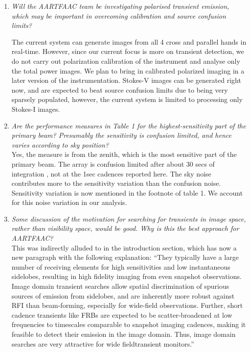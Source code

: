\documentclass{article}
\begin{document}
\begin {enumerate}
  
\item  \textit {Will  the  AARTFAAC team  be  investigating polarised  transient
  emission,  which  may  be  important  in  overcoming  calibration  and  source
  confusion limits?}

  The current system can generate images from  all 4 cross and parallel hands in
  real-time. However, since our current focus is more on transient detection, we
  do not carry  out polarization calibration of the instrument  and analyse only
  the total power images. We plan to  bring in calibrated polarized imaging in a
  later version of the instrumentation.   Stokes-V images can be generated right
  now,  and are  expected to  beat  source confusion  limits due  to being  very
  sparsely populated, however, the current  system is limited to processing only
  Stokes-I images.
  

\item   \textit   {Are  the   performance   measures   in   Table  1   for   the
  highest-sensitivity part  of the primary  beam? Presumably the  sensitivity is
  confusion limited, and hence varies according to sky position?}\\
  
  Yes, the measure is  from the zenith, which is the most  sensitive part of the
  primary  beam.   The  array  is  confusion limited  after  about  30  secs  of
  integration \citep{prasad2014real},  not at  the 1sec cadences  reported here.
  The sky noise contributes more to the sensitivity variation than the confusion
  noise. Sensitivity variation is now mentioned  in the footnote of table 1.  We
  account for this noise variation in our analysis.
  

\item \textit {Some discussion of the motivation for searching for transients in
  image space, rather than visibility space, would be good. Why is this the best
  approach for AARTFAAC?}\\

  This was  indirectly alluded to in  the introduction section, which  has now a
  new paragraph  with the following  explanation: ``They typically have  a large
  number  of receiving  elements for  high sensitivities  and low  instantaneous
  sidelobes, resulting in high fidelity imaging from even snapshot observations.
  Image  domain  transient searches  allow  spatial  discrimination of  spurious
  sources of emission from sidelobes, and are inherently more robust against RFI
  than  beam-forming, especially  for wide-field  observations.  Further,  short
  cadence  transients like  FRBs are  expected  to be  scatter-broadened at  low
  frequencies to timescales  comparable to snapshot imaging  cadences, making it
  feasible to  detect their emission  in the  image domain.  Thus,  image domain
  searches are very attractive for wide fieldtransient monitors.''


\end{enumerate}
\end{document}
